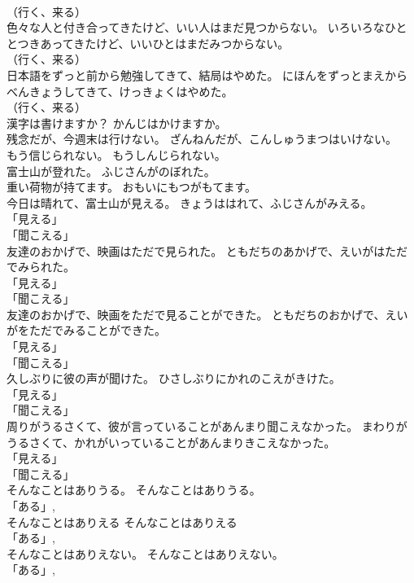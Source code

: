 \documentclass[8pt]{extreport}
\begin{document}
\begin{CJK}{UTF8}{min}
\\	（行く、来る） 
\\	色々な人と付き合ってきたけど、いい人はまだ見つからない。	いろいろなひととつきあってきたけど、いいひとはまだみつからない。	
\\	（行く、来る） 
\\	日本語をずっと前から勉強してきて、結局はやめた。	にほんをずっとまえからべんきょうしてきて、けっきょくはやめた。	
\\	（行く、来る） 
\\	漢字は書けますか？	かんじはかけますか。	
\\	残念だが、今週末は行けない。	ざんねんだが、こんしゅうまつはいけない。	
\\	もう信じられない。	もうしんじられない。	
\\	富士山が登れた。	ふじさんがのぼれた。	
\\	重い荷物が持てます。	おもいにもつがもてます。	
\\	今日は晴れて、富士山が見える。	きょうははれて、ふじさんがみえる。	
\\	「見える」 
\\	「聞こえる」 
\\	友達のおかげで、映画はただで見られた。	ともだちのあかげで、えいがはただでみられた。	
\\	「見える」 
\\	「聞こえる」 
\\	友達のおかげで、映画をただで見ることができた。	ともだちのおかげで、えいがをただでみることができた。	
\\	「見える」 
\\	「聞こえる」 
\\	久しぶりに彼の声が聞けた。	ひさしぶりにかれのこえがきけた。	
\\	「見える」 
\\	「聞こえる」 
\\	周りがうるさくて、彼が言っていることがあんまり聞こえなかった。	まわりがうるさくて、かれがいっていることがあんまりきこえなかった。	
\\	「見える」 
\\	「聞こえる」 
\\	そんなことはありうる。	そんなことはありうる。	
\\	「ある」, 
\\	そんなことはありえる	そんなことはありえる	
\\	「ある」, 
\\	そんなことはありえない。	そんなことはありえない。	
\\	「ある」, 

\end{CJK}
\end{document}
